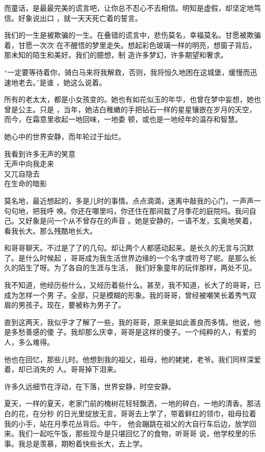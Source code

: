 \documentclass[12pt,a4paper]{article}
\begin{document}
		而童话，是最最完美的谎言吧，让你总不忍心不去相信。明知是虚假，却坚定地笃信。好象说出口
	，就一天天死亡着的誓言。

		我们的一生是被欺骗的一生。在叠错的谎言中，悲伤莫名，幸福莫名。甘愿被欺骗着，甘愿一次次
	在不醒悟的梦里走失。想起彩色玻璃一样的明亮，想窗子背后，那未知的陌生和美好。我们的臆想，制
	造许多梦幻，许多期望和奢求。

		“一定要等待着你，骑白马来将我解救，否则，我将恒久地困在这城堡，缓慢而迅速地老去。”是谁
	，她这么说着。

		所有的老太太，都是小女孩变的。她也有如花似玉的年华，也曾在梦中妄想，她也曾是公主。只是
	，当年，她洁白稚嫩的手把钻石一样的星星镶嵌在岁月的天空，而今，在霜意里收起一地回味，一地委
	顿，或也是一地经年的温存和智慧。

		她心中的世界安静，而年轮过于灿烂。

	\endwriting



		\longpoem{}{}{}
		我看到许多无声的笑意 \\
		无声中向我走来 \\
		又兀自隐去 \\
		在生命的暗影
		\endlongpoem

		莫名地，最近想起的，多是儿时的事情。点点滴滴，迷离中敲我的心门，一声声一句句地，把我呼
	唤。你还在哪里吗，你还住在那间栽了月季花的庭院吗。我问自己。又好象是问一个从不曾存在的声音
	。她是安静的，一语不发，玄奥地笑着，看我长大。那么残酷地长大。

		和哥哥聊天。不过是了了的几句。却让两个人都感动起来。是长久的无言与沉默了。是什么时候起
	，哥哥成为我生活世界边缘的一个名字或符号了呢。是那么长久的陌生了呀。为了各自的生涯与生活，
	我们好象童年的玩伴那样，两处不见。

		我不知道，他经历些什么，又经历着些什么。甚至，我不知道，长大了的哥哥，已成为怎样一个男
	子。全部，只是模糊的形象。我的哥哥，曾经被嘲笑长着秀气双眉的男孩子。现在，要被称为男子了。

		直到这两天，我似乎才了解了一些，我的哥哥，原来是如此善良而多情。他说，他是多愁善感的傻
	子。我却那么庆幸，哥哥是这样的傻子。一个纯粹的人，有爱的人，多么难得。

		他也在回忆，那些儿时。他想到我的祖父，祖母，他的姥姥，老爷。我们同样深爱着，却已消失的
	人。哥哥掉下泪来。

		许多久远细节在浮动，在下落，世界安静，时空安静。

		夏天，一样的夏天，老家门前的槐树花轻轻飘洒，一地的碎白，一地的清香。那洁白的花，在分秒
	的日光里绽放无言。哥哥去上学了，带着鲜红的领巾，祖母拉着我的小手，站在月季花丛背后。中午，
	他会蹦跳在祖父的大自行车后边，放学回来。我们一起吃午饭，那些现今是只堪回忆了的食物，听哥哥
	说，他学校里的乐事。我总是羡慕，期盼着快些长大，去上学。
\end{document}
